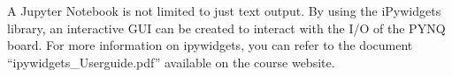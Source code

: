 A Jupyter Notebook is not limited to just text output. By using the iPywidgets library, an interactive GUI can be
created to interact with the I/O of the PYNQ board. For more information on ipywidgets, you can refer to the
document “ipywidgets_Userguide.pdf” available on the course website.

